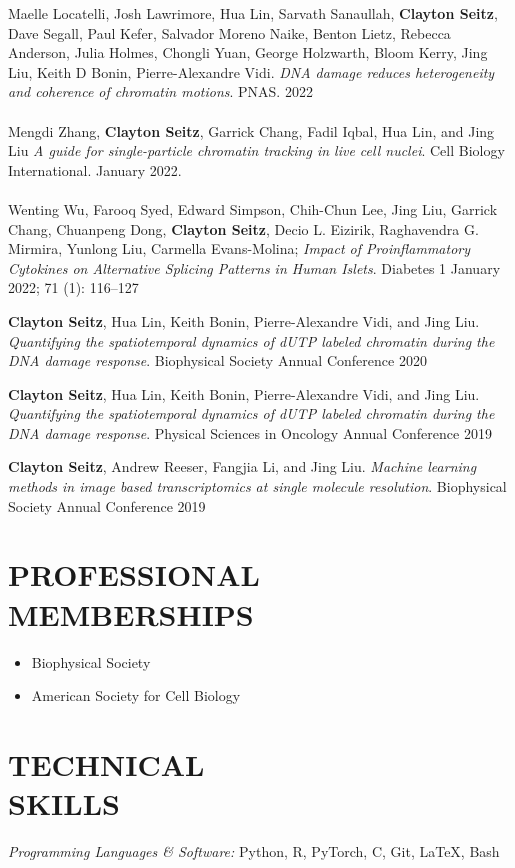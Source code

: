 \documentclass[margin, 10pt]{res} %
\begin{document}
\begin{resume}
Maelle Locatelli\textsuperscript{\textdagger}, Josh Lawrimore\textsuperscript{\textdagger}, Hua Lin\textsuperscript{\textdagger}, Sarvath Sanaullah, \textbf{Clayton Seitz}, Dave Segall, Paul Kefer, Salvador Moreno Naike, Benton Lietz, Rebecca Anderson, Julia Holmes, Chongli Yuan, George Holzwarth, Bloom Kerry, Jing Liu, Keith D Bonin, Pierre-Alexandre Vidi. \textit{DNA damage reduces heterogeneity and coherence of chromatin motions}. PNAS. 2022
\\
\\
Mengdi Zhang, \textbf{Clayton Seitz}, Garrick Chang, Fadil Iqbal, Hua Lin, and Jing Liu \textit{A guide for single-particle chromatin tracking in live cell nuclei}. Cell Biology International. January 2022.
\\
\\
Wenting Wu, Farooq Syed, Edward Simpson, Chih-Chun Lee, Jing Liu, Garrick Chang, Chuanpeng Dong, \textbf{Clayton Seitz}, Decio L. Eizirik, Raghavendra G. Mirmira, Yunlong Liu, Carmella Evans-Molina; \textit{Impact of Proinflammatory Cytokines on Alternative Splicing Patterns in Human Islets}. Diabetes 1 January 2022; 71 (1): 116–127

\textbf{Clayton Seitz}, Hua Lin, Keith Bonin, Pierre-Alexandre Vidi, and Jing Liu. \textit{Quantifying the spatiotemporal dynamics of dUTP labeled chromatin during the DNA damage response}. Biophysical Society Annual Conference 2020

\textbf{Clayton Seitz}, Hua Lin, Keith Bonin, Pierre-Alexandre Vidi, and Jing Liu. \textit{Quantifying the spatiotemporal dynamics of dUTP labeled chromatin during the DNA damage response}. Physical Sciences in Oncology Annual Conference 2019

\textbf{Clayton Seitz}, Andrew Reeser, Fangjia Li, and Jing Liu. \textit{Machine learning methods in image based transcriptomics at single molecule resolution}. Biophysical Society Annual Conference 2019


\section{PROFESSIONAL MEMBERSHIPS}

\begin{itemize}
\item Biophysical Society
\item American Society for Cell Biology
\end{itemize}

\section{TECHNICAL \\ SKILLS} 

{\sl Programming Languages \& Software:} 
Python, R, PyTorch, C, Git, LaTeX, Bash\\

\end{resume}
\end{document}
